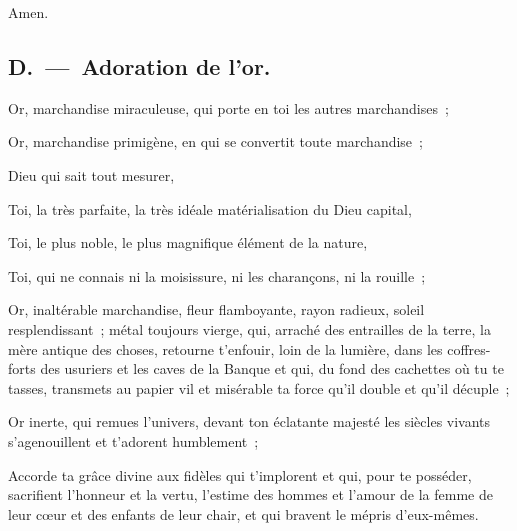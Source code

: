 \documentclass[french,twoside]{book} %
\begin{document}
\begin{center}
\noindent Amen.
\end{center}

\subsection[{D. — Adoration de l’or.}]{D. — Adoration de l’or.}
\noindent Or, marchandise miraculeuse, qui porte en toi les autres marchandises ;\par
Or, marchandise primigène, en qui se convertit toute marchandise ;\par
Dieu qui sait tout mesurer,\par
Toi, la très parfaite, la très idéale matérialisation du Dieu capital,\par
Toi, le plus noble, le plus magnifique élément de la nature,\par
Toi, qui ne connais ni la moisissure, ni les charançons, ni la rouille ;\par
Or, inaltérable marchandise, fleur flamboyante, rayon radieux, soleil resplendissant ; métal toujours vierge, qui, arraché des entrailles de la terre, la mère antique des choses, retourne t’enfouir, loin de la lumière, dans les coffres-forts des usuriers et les caves de la Banque et qui, du fond des cachettes où tu te tasses, transmets au papier vil et misérable ta force qu’il double et qu’il décuple ;\par
Or inerte, qui remues l’univers, devant ton éclatante majesté les siècles vivants s’agenouillent et t’adorent humblement ;\par
Accorde ta grâce divine aux fidèles qui t’implorent et qui, pour te posséder, sacrifient l’honneur et la vertu, l’estime des hommes et l’amour de la femme de leur cœur et des enfants de leur chair, et qui bravent le mépris d’eux-mêmes.\par

\begin{center}
\noindent *\par
\end{center}
\end{document}
